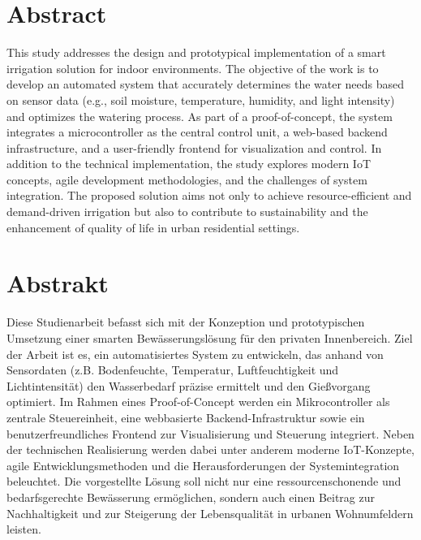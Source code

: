 \chapter*{Abstract}
This study addresses the design and prototypical implementation of a smart irrigation solution for indoor environments. The objective of the work is to develop an automated system that accurately determines the water needs based on sensor data (e.g., soil moisture, temperature, humidity, and light intensity) and optimizes the watering process. As part of a proof-of-concept, the system integrates a microcontroller as the central control unit, a web-based backend infrastructure, and a user-friendly frontend for visualization and control. In addition to the technical implementation, the study explores modern IoT concepts, agile development methodologies, and the challenges of system integration. The proposed solution aims not only to achieve resource-efficient and demand-driven irrigation but also to contribute to sustainability and the enhancement of quality of life in urban residential settings.
\newpage

\chapter*{Abstrakt}
Diese Studienarbeit befasst sich mit der Konzeption und prototypischen Umsetzung einer smarten Bewässerungslösung für den privaten Innenbereich. Ziel der Arbeit ist es, ein automatisiertes System zu entwickeln, das anhand von Sensordaten (z.B. Bodenfeuchte, Temperatur, Luftfeuchtigkeit und Lichtintensität) den Wasserbedarf präzise ermittelt und den Gießvorgang optimiert. Im Rahmen eines Proof-of-Concept werden ein Mikrocontroller als zentrale Steuereinheit, eine webbasierte Backend-Infrastruktur sowie ein benutzerfreundliches Frontend zur Visualisierung und Steuerung integriert. Neben der technischen Realisierung werden dabei unter anderem moderne IoT-Konzepte, agile Entwicklungsmethoden und die Herausforderungen der Systemintegration beleuchtet. Die vorgestellte Lösung soll nicht nur eine ressourcenschonende und bedarfsgerechte Bewässerung ermöglichen, sondern auch einen Beitrag zur Nachhaltigkeit und zur Steigerung der Lebensqualität in urbanen Wohnumfeldern leisten.